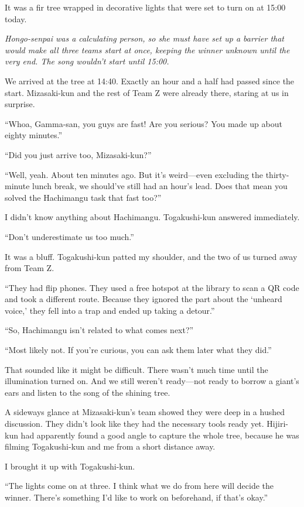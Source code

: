 \documentclass[
    a4paper,
    12pt,
    twoside,
    openany,
    UTF8,
    fontset=windows
]{ctexbook}
\begin{document}
It was a fir tree wrapped in decorative lights that were set to turn on at 15:00 today.

\textit{Hongo-senpai was a calculating person, so she must have set up a barrier that would make all three teams start at once, keeping the winner unknown until the very end. The song wouldn't start until 15:00.}

We arrived at the tree at 14:40. Exactly an hour and a half had passed since the start. Mizasaki-kun and the rest of Team Z were already there, staring at us in surprise.

``Whoa, Gamma-san, you guys are fast! Are you serious? You made up about eighty minutes.''

``Did you just arrive too, Mizasaki-kun?''

``Well, yeah. About ten minutes ago. But it's weird---even excluding the thirty-minute lunch break, we should've still had an hour's lead. Does that mean you solved the Hachimangu task that fast too?''

I didn't know anything about Hachimangu. Togakushi-kun answered immediately.

``Don't underestimate us too much.''

It was a bluff. Togakushi-kun patted my shoulder, and the two of us turned away from Team Z.

``They had flip phones. They used a free hotspot at the library to scan a QR code and took a different route. Because they ignored the part about the `unheard voice,' they fell into a trap and ended up taking a detour.''

``So, Hachimangu isn't related to what comes next?''

``Most likely not. If you're curious, you can ask them later what they did.''

That sounded like it might be difficult. There wasn't much time until the illumination turned on. And we still weren't ready---not ready to borrow a giant's ears and listen to the song of the shining tree.

A sideways glance at Mizasaki-kun's team showed they were deep in a hushed discussion. They didn't look like they had the necessary tools ready yet. Hijiri-kun had apparently found a good angle to capture the whole tree, because he was filming Togakushi-kun and me from a short distance away.

I brought it up with Togakushi-kun.

``The lights come on at three. I think what we do from here will decide the winner. There's something I'd like to work on beforehand, if that's okay.''
\end{document}
